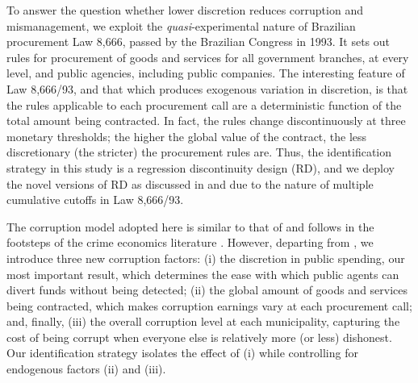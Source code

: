 \documentclass[11pt]{article}
\begin{document}
To answer the question whether lower discretion reduces corruption and mismanagement, we exploit the \emph{quasi}-experimental nature of Brazilian procurement Law 8,666, passed by the Brazilian Congress in 1993. It sets out rules for procurement of goods and services for all government branches, at every level, and public agencies, including public companies. The interesting feature of Law 8,666/93, and that which produces exogenous variation in discretion, is that the rules applicable to each procurement call are a deterministic function of the total amount being contracted. In fact, the rules change discontinuously at three monetary thresholds; the higher the global value of the contract, the less discretionary (the stricter) the procurement rules are. Thus, the identification strategy in this study is a regression discontinuity design (RD), and we deploy the novel versions of RD as discussed in \citet{CalonicoRobustNonparametricConfidence2014,CalonicoOptimalDataDrivenRegression2015} and \citet{CattaneoInterpretingRegressionDiscontinuity2016,CattaneoAnalysisRegressionDiscontinuity2018} due to the nature of multiple cumulative cutoffs in Law 8,666/93.

The corruption model adopted here is similar to that of \citet{OlkenCorruptionDevelopingCountries2012b} and follows in the footsteps of the crime economics literature \citep{BeckerCrimePunishmentEconomic1968,StiglerOptimumEnforcementLaws1970,BeckerLawEnforcementMalfeasance1974,Rose-AckermanEconomicsCorruption1975}. However, departing from \citet{OlkenCorruptionDevelopingCountries2012b}, we introduce three new corruption factors: (i) the discretion in public spending, our most important result, which determines the ease with which public agents can divert funds without being detected; (ii) the global amount of goods and services being contracted, which makes corruption earnings vary at each procurement call; and, finally, (iii) the overall corruption level at each municipality, capturing the cost of being corrupt when everyone else is relatively more (or less) dishonest. Our identification strategy isolates the effect of (i) while controlling for endogenous factors (ii) and (iii).
\end{document}
